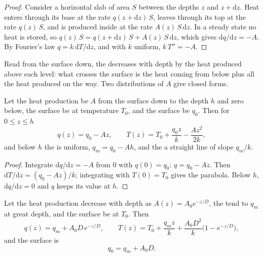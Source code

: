 \begin{proof}
Consider a horizontal slab of area $S$ between the depths $z$ and $z +
\mathrm dz$. Heat enters through its base at the rate $q(z + \mathrm dz)\,S$,
leaves through its top at the rate $q(z)\,S$, and is produced inside at the
rate $A(z)\,S\,\mathrm dz$. In a steady state no heat is stored, so
$q(z)\,S = q(z + \mathrm dz)\,S + A(z)\,S\,\mathrm dz$, which gives
$\mathrm dq/\mathrm dz = -A$. By Fourier's law $q = k\,\mathrm dT/\mathrm dz$,
and with $k$ uniform, $k\,T'' = -A$.
\end{proof}

Read from the surface down, the  decreases with depth by the heat
produced above each level: what crosses the surface is the heat coming from
below plus all the heat produced on the way. Two distributions of $A$ give
closed forms.

\begin{proposition}\label{prop:b1:heat-budget:uniform}
Let the heat production be $A$ from the surface down to the depth $h$ and zero
below, the surface be at temperature $T_0$, and the surface  be $q_0$.
Then for $0 \le z \le h$
\[
  q(z) = q_0 - A z, \qquad T(z) = T_0 + \frac{q_0 z}{k} - \frac{A z^2}{2k},
\]
and below $h$ the  is uniform, $q_m = q_0 - A h$, and the  a
straight line of slope $q_m/k$.
\end{proposition}

\begin{proof}
Integrate $\mathrm dq/\mathrm dz = -A$ from $0$ with $q(0) = q_0$: $q = q_0 -
Az$. Then $\mathrm dT/\mathrm dz = (q_0 - Az)/k$; integrating with $T(0) = T_0$
gives the parabola. Below $h$, $\mathrm dq/\mathrm dz = 0$ and $q$ keeps its
value at $h$.
\end{proof}

\begin{theorem}
\label{thm:b1:heat-budget:exponential}
Let the heat production decrease with depth as $A(z) = A_0 e^{-z/D}$, the  tend to $q_m$ at great depth, and the surface be at $T_0$. Then
\[
  q(z) = q_m + A_0 D\,e^{-z/D}, \qquad
  T(z) = T_0 + \frac{q_m z}{k} + \frac{A_0 D^2}{k}\bigl(1 - e^{-z/D}\bigr),
\]
and the surface  is
\[
  q_0 = q_m + A_0 D .
\]
\end{theorem}


